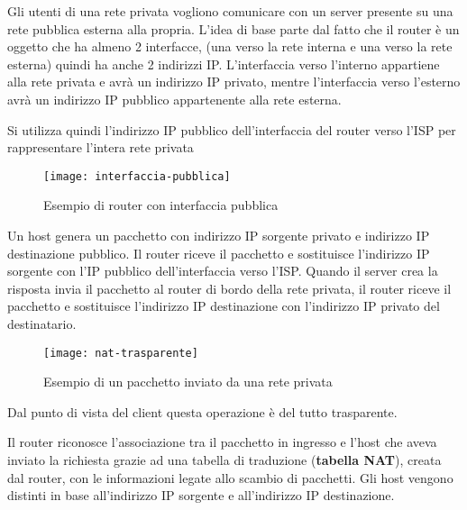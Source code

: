 \documentclass[a4paper]{article}
\begin{document}
\begin{example}
  Gli utenti di una rete privata vogliono comunicare con un server presente su una rete
  pubblica esterna alla propria. L'idea di base parte dal fatto che il router è un
  oggetto che ha almeno 2 interfacce, (una verso la rete interna e una verso la rete esterna)
  quindi ha anche 2 indirizzi IP. L'interfaccia verso l'interno appartiene alla rete
  privata e avrà un indirizzo IP privato, mentre l'interfaccia verso l'esterno avrà un
  indirizzo IP pubblico appartenente alla rete esterna.

  \vspace{1em}
  \noindent
  Si utilizza quindi l'indirizzo IP pubblico dell'interfaccia del router verso l'ISP
  per rappresentare l'intera rete privata
  \begin{figure}[H]
    \centering
    \texttt{[image: interfaccia-pubblica]}
    \caption{Esempio di router con interfaccia pubblica}
  \end{figure}

  \noindent
  Un host genera un pacchetto con indirizzo IP sorgente privato e indirizzo IP destinazione
  pubblico. Il router riceve il pacchetto e sostituisce l'indirizzo IP sorgente con l'IP
  pubblico dell'interfaccia verso l'ISP. Quando il server crea la risposta invia il
  pacchetto al router di bordo della rete privata, il router riceve il pacchetto e
  sostituisce l'indirizzo IP destinazione con l'indirizzo IP privato del destinatario.
  \begin{figure}[H]
    \centering
    \texttt{[image: nat-trasparente]}
    \caption{Esempio di un pacchetto inviato da una rete privata}
  \end{figure}
  \noindent
  Dal punto di vista del client questa operazione è del tutto trasparente.
\end{example}

\noindent
Il router riconosce l'associazione tra il pacchetto in ingresso e l'host che aveva
inviato la richiesta grazie ad una tabella di traduzione (\textbf{tabella NAT}), creata 
dal router, con le informazioni legate allo scambio di pacchetti. Gli host vengono
distinti in base all'indirizzo IP sorgente e all'indirizzo IP destinazione.
\end{document}
